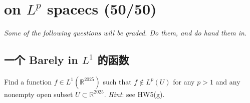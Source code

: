 \documentclass[lang=cn,11pt]{elegantbook}
\begin{document}
\chapter{on $L^p$ spacecs (50/50)}

\vspace*{5mm}
\begin{center}
\textit{Some of the following questions will be graded. Do them, and do hand them in}.
\end{center}

\section{一个 Barely in $L^1$ 的函数}
Find a function $f\in L^1(\mathbb{R}^{2025})$ such that $f\not\in L^p(U)$ for any $p>1$ and any nonempty open subset $U\subset \mathbb{R}^{2025}$. \textit{Hint}: see HW5(g).
\end{document}
